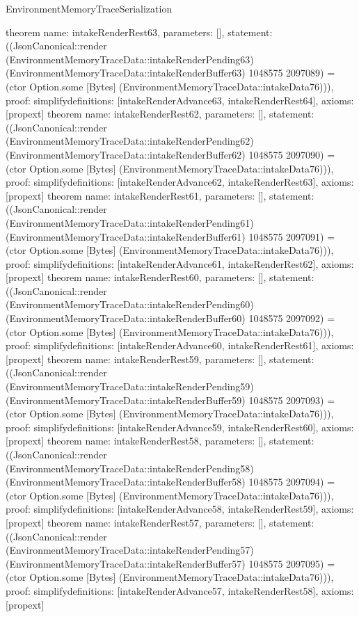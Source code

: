 \begin{lexlean}{EnvironmentMemoryTraceSerialization}
\begin{semanticmodule}
{}
theorem{
 name: intakeRenderRest63, parameters: [],
 statement: ((JsonCanonical::render (EnvironmentMemoryTraceData::intakeRenderPending63) (EnvironmentMemoryTraceData::intakeRenderBuffer63) 1048575 2097089) = (ctor Option.some [Bytes] (EnvironmentMemoryTraceData::intakeData76))), proof: simplify{definitions: [intakeRenderAdvance63, intakeRenderRest64]}, axioms: [propext]
}
theorem{
 name: intakeRenderRest62, parameters: [],
 statement: ((JsonCanonical::render (EnvironmentMemoryTraceData::intakeRenderPending62) (EnvironmentMemoryTraceData::intakeRenderBuffer62) 1048575 2097090) = (ctor Option.some [Bytes] (EnvironmentMemoryTraceData::intakeData76))), proof: simplify{definitions: [intakeRenderAdvance62, intakeRenderRest63]}, axioms: [propext]
}
theorem{
 name: intakeRenderRest61, parameters: [],
 statement: ((JsonCanonical::render (EnvironmentMemoryTraceData::intakeRenderPending61) (EnvironmentMemoryTraceData::intakeRenderBuffer61) 1048575 2097091) = (ctor Option.some [Bytes] (EnvironmentMemoryTraceData::intakeData76))), proof: simplify{definitions: [intakeRenderAdvance61, intakeRenderRest62]}, axioms: [propext]
}
theorem{
 name: intakeRenderRest60, parameters: [],
 statement: ((JsonCanonical::render (EnvironmentMemoryTraceData::intakeRenderPending60) (EnvironmentMemoryTraceData::intakeRenderBuffer60) 1048575 2097092) = (ctor Option.some [Bytes] (EnvironmentMemoryTraceData::intakeData76))), proof: simplify{definitions: [intakeRenderAdvance60, intakeRenderRest61]}, axioms: [propext]
}
theorem{
 name: intakeRenderRest59, parameters: [],
 statement: ((JsonCanonical::render (EnvironmentMemoryTraceData::intakeRenderPending59) (EnvironmentMemoryTraceData::intakeRenderBuffer59) 1048575 2097093) = (ctor Option.some [Bytes] (EnvironmentMemoryTraceData::intakeData76))), proof: simplify{definitions: [intakeRenderAdvance59, intakeRenderRest60]}, axioms: [propext]
}
theorem{
 name: intakeRenderRest58, parameters: [],
 statement: ((JsonCanonical::render (EnvironmentMemoryTraceData::intakeRenderPending58) (EnvironmentMemoryTraceData::intakeRenderBuffer58) 1048575 2097094) = (ctor Option.some [Bytes] (EnvironmentMemoryTraceData::intakeData76))), proof: simplify{definitions: [intakeRenderAdvance58, intakeRenderRest59]}, axioms: [propext]
}
theorem{
 name: intakeRenderRest57, parameters: [],
 statement: ((JsonCanonical::render (EnvironmentMemoryTraceData::intakeRenderPending57) (EnvironmentMemoryTraceData::intakeRenderBuffer57) 1048575 2097095) = (ctor Option.some [Bytes] (EnvironmentMemoryTraceData::intakeData76))), proof: simplify{definitions: [intakeRenderAdvance57, intakeRenderRest58]}, axioms: [propext]
}
\end{semanticmodule}
\end{lexlean}
